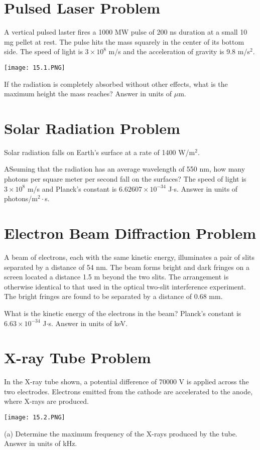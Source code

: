 \documentclass[../physics12.tex]{subfiles}
\begin{document}
\section{Pulsed Laser Problem}
A vertical pulsed laster fires a 1000 MW pulse of 200 ns duration at a small 10 mg pellet at rest. The pulse hits the mass squarely in the center of its bottom side.
The speed of light is $3\times 10^8$ m/s and the acceleration of gravity is 9.8 m/s$^2$.
\begin{center}
    \texttt{[image: 15.1.PNG]}
\end{center}
If the radiation is completely absorbed without other effects, what is the maximum height the mass reaches? Answer in units of $\mu$m.

\section{Solar Radiation Problem}
Solar radiation falls on Earth's surface at a rate of 1400 W/m$^2$.

ASsuming that the radiation has an average wavelength of 550 nm, how many photons per square meter per second fall on the surfaces? The speed of light is $3\times 10^8$ m/s and 
Planck's constant is $6.62607\times 10^{-34}$ J$\cdot$s. Answer in units of photons/m$^2\cdot$s.

\section{Electron Beam Diffraction Problem}
A beam of electrons, each with the same kinetic energy, illuminates a pair of slits separated by a distance of 54 nm. The beam forms bright and dark 
fringes on a screen located a distance 1.5 m beyond the two slits. The arrangement is otherwise identical to that used in the optical two-slit interference experiment. 
The bright fringes are found to be separated by a distance of 0.68 mm. 

What is the kinetic energy of the electrons in the beam? Planck's constant is $6.63\times 10^{-34}$ J$\cdot$s. Answer in units of keV.

\section{X-ray Tube Problem}
In the X-ray tube shown, a potential difference of 70000 V is applied across the two electrodes. Electrons emitted from the cathode are accelerated to the anode, where X-rays are produced.
\begin{center}
    \texttt{[image: 15.2.PNG]}
\end{center}
(a) Determine the maximum frequency of the X-rays produced by the tube. Answer in units of kHz.
\end{document}
